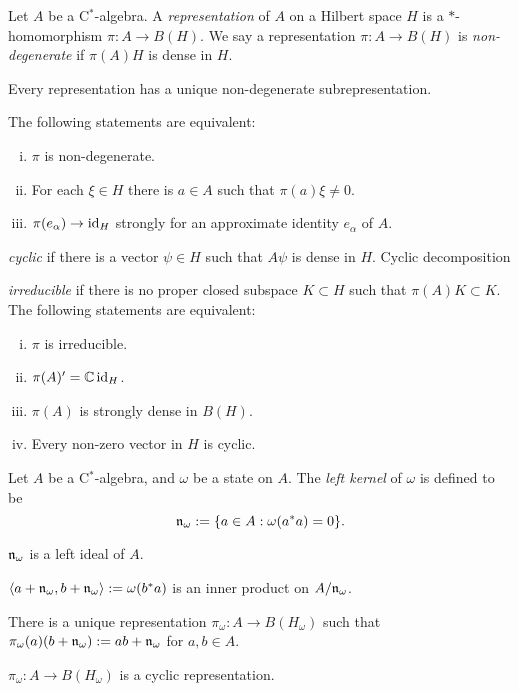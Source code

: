 \documentclass{../../large}
\begin{document}
\begin{prb}
Let $A$ be a C$^*$-algebra.
A \emph{representation} of $A$ on a Hilbert space $H$ is a $*$-homomorphism $\pi:A\to B(H)$.
We say a representation $\pi:A\to B(H)$ is \emph{non-degenerate} if $\pi(A)H$ is dense in $H$.
\begin{parts}
\item Every representation has a unique non-degenerate subrepresentation.
\item The following statements are equivalent:
\begin{enumerate}[(i)]
\item $\pi$ is non-degenerate.
\item For each $\xi\in H$ there is $a\in A$ such that $\pi(a)\xi\ne0$.
\item $\pi(e_\alpha)\to\operatorname{id}_H$ strongly for an approximate identity $e_\alpha$ of $A$.
\end{enumerate}
\end{parts}
\end{prb}

\begin{prb}
\emph{cyclic} if there is a vector $\psi\in H$ such that $A\psi$ is dense in $H$.
Cyclic decomposition
\end{prb}


\begin{prb}
\emph{irreducible} if there is no proper closed subspace $K\subset H$ such that $\pi(A)K\subset K$.
The following statements are equivalent:
\begin{enumerate}[(i)]
\item $\pi$ is irreducible.
\item $\pi(A)'=\mathbb{C}\operatorname{id}_H$.
\item $\pi(A)$ is strongly dense in $B(H)$.
\item Every non-zero vector in $H$ is cyclic.
\end{enumerate}
\end{prb}


\begin{prb}
Let $A$ be a C$^*$-algebra, and $\omega$ be a state on $A$.
The \emph{left kernel} of $\omega$ is defined to be
\[\mathfrak{n}_\omega:=\{a\in A:\omega(a^*a)=0\}.\]
\begin{parts}
\item $\mathfrak{n}_\omega$ is a left ideal of $A$.
\item $\langle a+\mathfrak{n}_\omega,b+\mathfrak{n}_\omega\rangle:=\omega(b^*a)$ is an inner product on $A/\mathfrak{n}_\omega$.
\item There is a unique representation $\pi_\omega:A\to B(H_\omega)$ such that $\pi_\omega(a)(b+\mathfrak{n}_\omega):=ab+\mathfrak{n}_\omega$ for $a,b\in A$.
\item $\pi_\omega:A\to B(H_\omega)$ is a cyclic representation.
\end{parts}
\end{prb}
\end{document}

